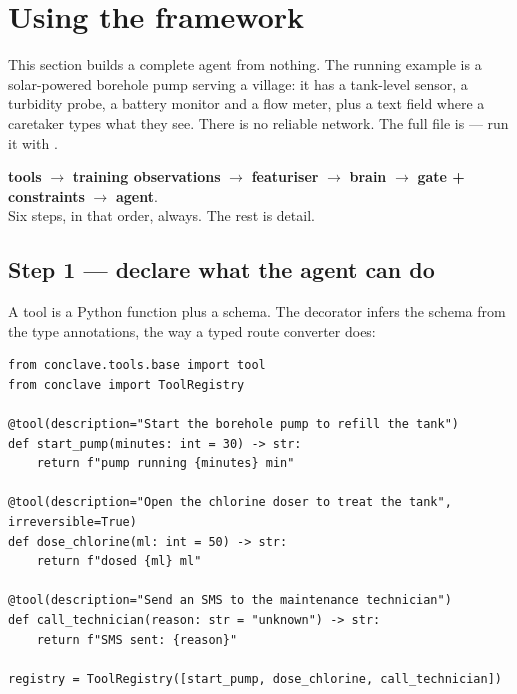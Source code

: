 \section{Using the framework}\label{sec:framework}

This section builds a complete agent from nothing. The running example is a
solar-powered borehole pump serving a village: it has a tank-level sensor, a
turbidity probe, a battery monitor and a flow meter, plus a text field where a
caretaker types what they see. There is no reliable network. The full file is
 --- run it with
.

\begin{keybox}
\textbf{tools} $\rightarrow$ \textbf{training observations} $\rightarrow$
\textbf{featuriser} $\rightarrow$ \textbf{brain} $\rightarrow$
\textbf{gate + constraints} $\rightarrow$ \textbf{agent}.\\[2mm]
Six steps, in that order, always. The rest is detail.
\end{keybox}

\subsection{Step 1 --- declare what the agent can do}

A tool is a Python function plus a schema. The  decorator infers the
schema from the type annotations, the way a typed route converter does:

\begin{codebox}[Tools]
\begin{lstlisting}[style=py]
from conclave.tools.base import tool
from conclave import ToolRegistry

@tool(description="Start the borehole pump to refill the tank")
def start_pump(minutes: int = 30) -> str:
    return f"pump running {minutes} min"

@tool(description="Open the chlorine doser to treat the tank", irreversible=True)
def dose_chlorine(ml: int = 50) -> str:
    return f"dosed {ml} ml"

@tool(description="Send an SMS to the maintenance technician")
def call_technician(reason: str = "unknown") -> str:
    return f"SMS sent: {reason}"

registry = ToolRegistry([start_pump, dose_chlorine, call_technician])
\end{lstlisting}
\end{codebox}

